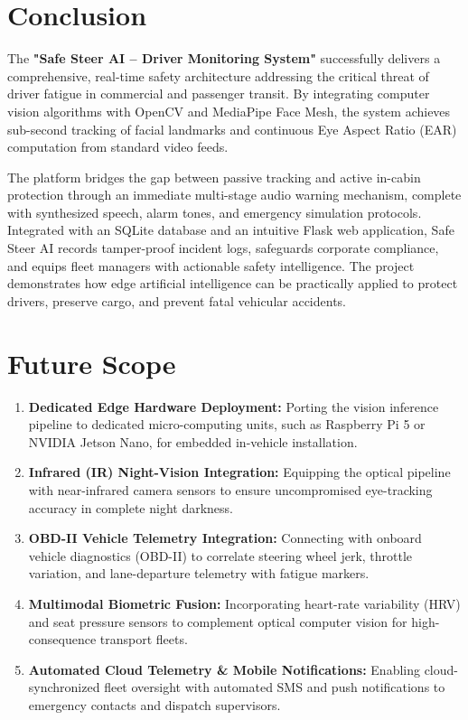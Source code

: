 \documentclass[a4paper,12pt]{report}
\begin{document}
\section{Conclusion}
\par
The \textbf{"Safe Steer AI -- Driver Monitoring System"} successfully delivers a comprehensive, real-time safety architecture addressing the critical threat of driver fatigue in commercial and passenger transit. By integrating computer vision algorithms with OpenCV and MediaPipe Face Mesh, the system achieves sub-second tracking of facial landmarks and continuous Eye Aspect Ratio (EAR) computation from standard video feeds. 

The platform bridges the gap between passive tracking and active in-cabin protection through an immediate multi-stage audio warning mechanism, complete with synthesized speech, alarm tones, and emergency simulation protocols. Integrated with an SQLite database and an intuitive Flask web application, Safe Steer AI records tamper-proof incident logs, safeguards corporate compliance, and equips fleet managers with actionable safety intelligence. The project demonstrates how edge artificial intelligence can be practically applied to protect drivers, preserve cargo, and prevent fatal vehicular accidents.

\section{Future Scope}
\begin{enumerate}
    \item \textbf{Dedicated Edge Hardware Deployment:} Porting the vision inference pipeline to dedicated micro-computing units, such as Raspberry Pi 5 or NVIDIA Jetson Nano, for embedded in-vehicle installation.
    \item \textbf{Infrared (IR) Night-Vision Integration:} Equipping the optical pipeline with near-infrared camera sensors to ensure uncompromised eye-tracking accuracy in complete night darkness.
    \item \textbf{OBD-II Vehicle Telemetry Integration:} Connecting with onboard vehicle diagnostics (OBD-II) to correlate steering wheel jerk, throttle variation, and lane-departure telemetry with fatigue markers.
    \item \textbf{Multimodal Biometric Fusion:} Incorporating heart-rate variability (HRV) and seat pressure sensors to complement optical computer vision for high-consequence transport fleets.
    \item \textbf{Automated Cloud Telemetry \& Mobile Notifications:} Enabling cloud-synchronized fleet oversight with automated SMS and push notifications to emergency contacts and dispatch supervisors.
\end{enumerate}
\end{document}
